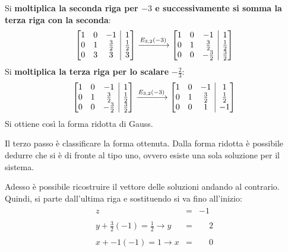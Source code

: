 \documentclass[a4paper]{article}
\makeatletter
\newenvironment{rowequmatbra}[1]{\left[\array{@{}#1@{}}}{\endarray\right]}
\makeatother
\begin{document}
	Si \textbf{moltiplica la seconda riga per $-3$ e successivamente si somma la terza riga con la seconda}:
	\begin{equation*}
		\begin{rowequmatbra}{ccc|c}
			1  & 0 & -1 & 1 \\
			0  & 1 &  \frac{3}{2} & \frac{1}{2} \\
			0  & 3 &  3 & 3
		\end{rowequmatbra} \xlongrightarrow{E_{3,2}\left(-3\right)}
		\begin{rowequmatbra}{ccc|c}
			1  & 0 & -1 & 1 \\
			0  & 1 &  \frac{3}{2} & \frac{1}{2} \\
			0  & 0 &  -\frac{3}{2} & \frac{3}{2}
		\end{rowequmatbra}
	\end{equation*}
	Si \textbf{moltiplica la terza riga per lo scalare} $-\frac{2}{3}$:
	\begin{equation*}
		\begin{rowequmatbra}{ccc|c}
			1  & 0 & -1 & 1 \\
			0  & 1 &  \frac{3}{2} & \frac{1}{2} \\
			0  & 0 &  -\frac{3}{2} & \frac{3}{2}
		\end{rowequmatbra} \xlongrightarrow{E_{3,2}\left(-3\right)}
		\begin{rowequmatbra}{ccc|c}
			1  & 0 & -1 & 1 \\
			0  & 1 &  \frac{3}{2} & \frac{1}{2} \\
			0  & 0 &  1 & -1
		\end{rowequmatbra}
	\end{equation*}
	Si ottiene così la forma ridotta di Gauss.\newline
	
	\noindent
	Il \textcolor{Red3}{terzo passo} è classificare la forma ottenuta. Dalla forma ridotta è possibile dedurre che si è di fronte al tipo uno, ovvero esiste una sola soluzione per il sistema.
	
	Adesso è possibile ricostruire il vettore delle soluzioni andando al contrario. Quindi, si parte dall'ultima riga e sostituendo si va fino all'inizio:
	\begin{gather*}
		\begin{array}{rll}
			z & = & -1 \\
			\\
			y + \frac{3}{2}\left(-1\right) = \frac{1}{2} \rightarrow y & = & \phantom{-}2 \\
			\\
			x + -1\left(-1\right) = 1 \rightarrow x & = & \phantom{-}0
		\end{array}
	\end{gather*}\newpage
\end{document}
